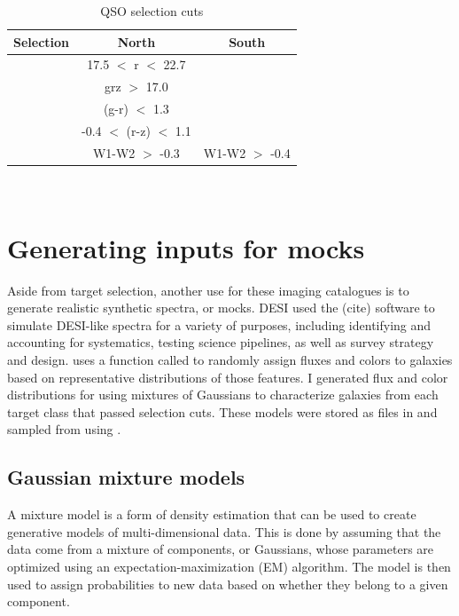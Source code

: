 \begin{table}
\caption{QSO selection cuts}
\label{tab:qso_cuts}
\centering
\begin{tabular}{|c|c|c|}
  \hline
  Selection & North & South\\
  \hline \hline
   & 17.5 $<$ r $<$ 22.7  \\
  \hline
   & grz $>$ 17.0  \\
  \hline
   & (g-r) $<$ 1.3 \\
  \hline
   & -0.4 $<$ (r-z) $<$ 1.1 \\
  \hline
   & W1-W2 $>$ -0.3 & W1-W2 $>$ -0.4\\
  \hline
\end{tabular}
\end{table}\\

\section{Generating inputs for mocks}
Aside from target selection, another use for these imaging catalogues is to generate realistic synthetic spectra, or mocks. DESI used the  (cite) software to simulate DESI-like spectra for a variety of purposes, including identifying and accounting for systematics, testing science pipelines, as well as survey strategy and design.  uses a function called  to randomly assign fluxes and colors to galaxies based on representative distributions of those features. I generated flux and color distributions for  using mixtures of Gaussians to characterize galaxies from each target class that passed selection cuts. These models were stored as  files in  and sampled from using .


\subsection{Gaussian mixture models}


A mixture model is a form of density estimation that can be used to create generative models of multi-dimensional data. This is done by assuming that the data come from a mixture of components, or Gaussians, whose parameters are optimized using an expectation-maximization (EM) algorithm. The model is then used to assign probabilities to new data based on whether they belong to a given component. 

